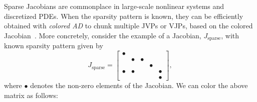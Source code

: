 Sparse Jacobians are commonplace in large-scale nonlinear systems and discretized PDEs. %
When the sparsity pattern is known, they can be efficiently obtained with \textit{colored AD} to chunk multiple JVPs or VJPs, based on the colored Jacobian~\cite{gebremedhin2005color}.
More concretely, consider the example of a Jacobian, ${J}_{\text{sparse}}$, with known sparsity pattern given by
\begin{equation}
    {J}_{\text{sparse}} = \begin{bmatrix}
        \bullet &         &         &         &         \\
                & \bullet & \bullet &         &         \\
                &         &         & \bullet &         \\
        \bullet & \bullet &         &         & \bullet \\
                &         &         &         & \bullet
    \end{bmatrix},
\end{equation}
where $\bullet$ denotes the non-zero elements of the Jacobian. 
We can color the above matrix as follows: %
